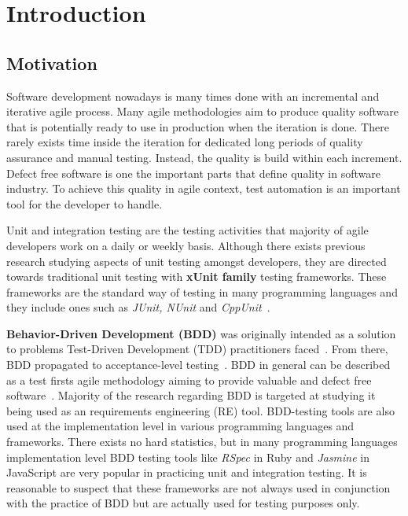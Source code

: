 \chapter{Introduction}
\label{chapter:intro}
\section{Motivation}
Software development nowadays is many times done with an incremental and iterative agile process.
Many agile methodologies aim to produce quality software that is potentially ready to use in production when the iteration
is done. There rarely exists time inside the iteration for dedicated long periods of quality assurance and manual testing.
Instead, the quality is build within each increment. Defect free software is one the important parts that define
quality in software industry. To achieve this quality in agile context, test automation is
an important tool for the developer to handle. ~\cite{prechelt2016quality}

Unit and integration testing are the testing activities that majority of agile developers work on a daily or weekly basis.
Although there exists previous research studying aspects of unit testing amongst developers, they are directed
towards traditional unit testing with \textbf{xUnit family} testing frameworks. These frameworks are the standard way of testing
in many programming languages and they include ones such as \textit{JUnit, NUnit} and \textit{CppUnit}~\cite{hamill2004unit}.

\textbf{Behavior-Driven Development (BDD)} was originally intended as a solution to problems Test-Driven Development (TDD) practitioners
faced~\cite{bdd2006north}. From there, BDD propagated to acceptance-level testing~\cite{bdd2006north}. BDD in general can be described as a test firsts agile methodology
aiming to provide valuable and defect free software~\cite{chelimsky2010rspec}.
Majority of the research regarding BDD is targeted at studying
it being used as an requirements engineering (RE) tool. BDD-testing tools are also used at the implementation level in various
programming languages and frameworks. There exists no hard statistics, but in many programming languages implementation level BDD
testing tools like \textit{RSpec} in Ruby and \textit{Jasmine} in JavaScript are very popular in practicing unit and integration testing.
It is reasonable to suspect that these frameworks are not always used in conjunction with the practice of BDD but are actually used for testing
purposes only.

